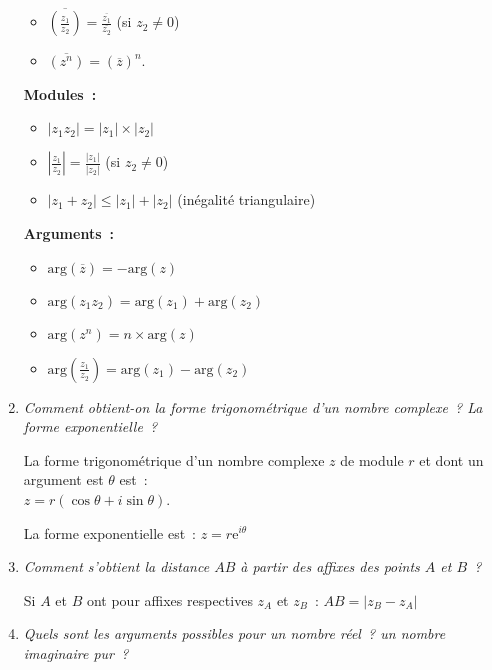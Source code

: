 \begin{reponses}
\begin{enumerate}
\begin{itemize}
               \item $\overline{\left(\frac{z_1}{z_2}\right)} = \frac{\overline{z_1}}{\overline{z_2}}  $ (si $z_2\neq 0$)
               \item $\overline{\left(z^{n}\right)} = \left(\overline{z}\right)^{n}$.
          \end{itemize}
          \textbf{Modules~:}
          \begin{itemize}
               \item $|z_1z_2| = |z_1|\times |z_2|$
               \item $|\frac{z_1}{z_2}| = \frac{|z_1|}{|z_2|}  $ (si $z_2\neq 0$)
               \item $|z_1+z_2| \leqslant |z_1| + |z_2|$ (inégalité triangulaire)
          \end{itemize}
          \textbf{Arguments~:}
          \begin{itemize}
               \item $\text{arg}\left(\overline{z}\right)=-\text{arg}\left(z\right)$
               \item $\text{arg}\left(z_1z_2\right)=\text{arg}\left(z_1\right)+\text{arg}\left(z_2\right)$
               \item $\text{arg}\left(z^{n}\right)=n\times \text{arg}\left(z\right)$
               \item $\text{arg}\left(\frac{z_1}{z_2}\right)=\text{arg}\left(z_1\right)-\text{arg}\left(z_2\right)$
          \end{itemize}
          \par
          \item %
          \textit{Comment obtient-on  la forme trigonométrique d'un nombre complexe~? La forme exponentielle~?}
          \par
          La forme trigonométrique d'un nombre complexe $z$ de module $r$ et dont un argument est $\theta$ est~:\\
          $z=r(\cos \theta + i \sin \theta)$.
          \par
          La forme exponentielle est~:
          $z=r\text{e}^{i\theta}$
          \item %
          \textit{Comment s'obtient la distance $AB$ à partir des affixes des points $A$ et $B$~?}
          \par
          Si $A$ et $B$ ont pour affixes respectives $z_A$ et $z_B$~:
          $AB=\left|z_B-z_A\right|$
          \item %
          \textit{Quels sont les arguments possibles pour un nombre réel~? un nombre imaginaire pur~?}

\end{enumerate}
\end{reponses}

